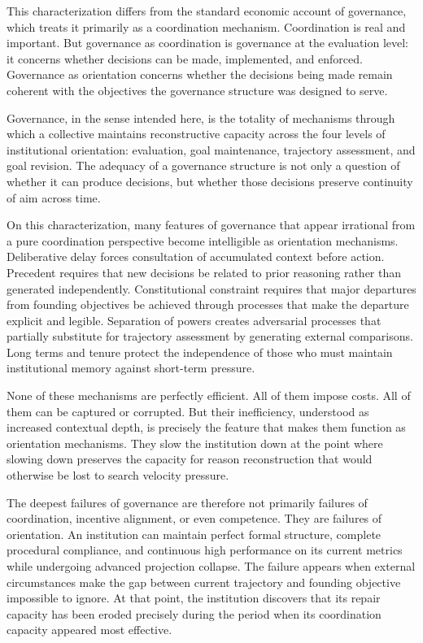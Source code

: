 This characterization differs from the standard economic account of governance,
which treats it primarily as a coordination mechanism. Coordination is real
and important. But governance as coordination is governance at the evaluation
level: it concerns whether decisions can be made, implemented, and enforced.
Governance as orientation concerns whether the decisions being made remain
coherent with the objectives the governance structure was designed to serve.

\begin{defn}
Governance, in the sense intended here, is the totality of mechanisms through
which a collective maintains reconstructive capacity across the four levels
of institutional orientation: evaluation, goal maintenance, trajectory
assessment, and goal revision. The adequacy of a governance structure is
not only a question of whether it can produce decisions, but whether those
decisions preserve continuity of aim across time.
\end{defn}

On this characterization, many features of governance that appear irrational
from a pure coordination perspective become intelligible as orientation
mechanisms. Deliberative delay forces consultation of accumulated context
before action. Precedent requires that new decisions be related to prior
reasoning rather than generated independently. Constitutional constraint
requires that major departures from founding objectives be achieved through
processes that make the departure explicit and legible. Separation of powers
creates adversarial processes that partially substitute for trajectory
assessment by generating external comparisons. Long terms and tenure protect
the independence of those who must maintain institutional memory against
short-term pressure.

None of these mechanisms are perfectly efficient. All of them impose costs.
All of them can be captured or corrupted. But their inefficiency, understood
as increased contextual depth, is precisely the feature that makes them
function as orientation mechanisms. They slow the institution down at the
point where slowing down preserves the capacity for reason reconstruction
that would otherwise be lost to search velocity pressure.

The deepest failures of governance are therefore not primarily failures of
coordination, incentive alignment, or even competence. They are failures of
orientation. An institution can maintain perfect formal structure, complete
procedural compliance, and continuous high performance on its current metrics
while undergoing advanced projection collapse. The failure appears when
external circumstances make the gap between current trajectory and founding
objective impossible to ignore. At that point, the institution discovers
that its repair capacity has been eroded precisely during the period when
its coordination capacity appeared most effective.

